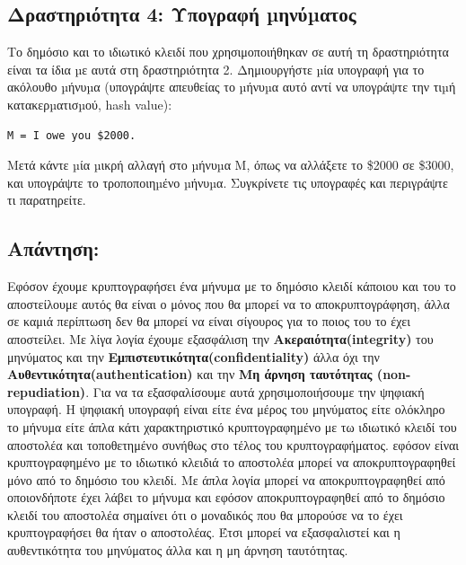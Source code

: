 \subsection{Δραστηριότητα 4: Υπογραφή µηνύµατος}
\noindent
Το δημόσιο και το ιδιωτικό κλειδί που χρησιμοποιήθηκαν σε αυτή τη δραστηριότητα είναι τα
ίδια µε αυτά στη δραστηριότητα 2. Δημιουργήστε µία υπογραφή για το ακόλουθο µήνυµα
(υπογράψτε απευθείας το µήνυµα αυτό αντί να υπογράψτε την τιµή κατακερµατισµού, hash
value):

\begin{lstlisting}
M = I owe you $2000.
\end{lstlisting}

\noindent
Μετά κάντε µία µικρή αλλαγή στο µήνυµα M, όπως να αλλάξετε το \$2000 σε \$3000, και
υπογράψτε το τροποποιηµένο µήνυµα. Συγκρίνετε τις υπογραφές και περιγράψτε τι
παρατηρείτε.

\subsection*{Απάντηση:}
\noindent
Εφόσον έχουμε κρυπτογραφήσει ένα μήνυμα με το δημόσιο κλειδί κάποιου και του το αποστείλουμε 
αυτός θα είναι ο μόνος που θα μπορεί να το αποκρυπτογράφηση, άλλα σε καμιά περίπτωση δεν θα μπορεί να 
είναι σίγουρος για το ποιος του το έχει αποστείλει. Με λίγα λογία έχουμε εξασφάλιση την 
\textbf{Ακεραιότητα(integrity)} του μηνύματος και την \textbf{Εμπιστευτικότητα(confidentiality)} άλλα
όχι την \textbf{Αυθεντικότητα(authentication)} και την \textbf{Μη άρνηση ταυτότητας (non-repudiation)}.
Για να τα εξασφαλίσουμε αυτά χρησιμοποιήσουμε την ψηφιακή υπογραφή. Η ψηφιακή υπογραφή είναι είτε ένα μέρος
του μηνύματος είτε ολόκληρο το μήνυμα είτε άπλα κάτι χαρακτηριστικό κρυπτογραφημένο με τω ιδιωτικό κλειδί
του αποστολέα και τοποθετημένο συνήθως στο τέλος του κρυπτογραφήματος. εφόσον είναι κρυπτογραφημένο
με το ιδιωτικό κλειδιά το αποστολέα μπορεί να αποκρυπτογραφηθεί μόνο από το δημόσιο του κλειδί. Με άπλα λογία 
μπορεί να αποκρυπτογραφηθεί από οποιονδήποτε έχει λάβει το μήνυμα και εφόσον αποκρυπτογραφηθεί από το δημόσιο
κλειδί του αποστολέα σημαίνει ότι ο μοναδικός που θα μπορούσε να το έχει κρυπτογραφήσει θα ήταν ο αποστολέας.
Έτσι μπορεί να εξασφαλιστεί και η αυθεντικότητα του μηνύματος άλλα και η μη άρνηση ταυτότητας.

